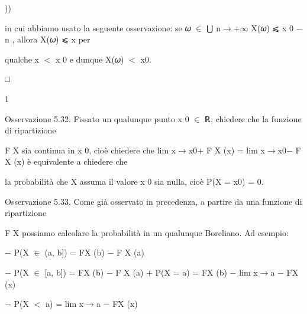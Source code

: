 \documentclass[a4paper,portrait,12pt]{article}
\begin{document}
))





\begin{flushleft}
in cui abbiamo usato la seguente osservazione: se 𝜔 $\in$ ⋃ n$\rightarrow$+$\infty$ X(𝜔) ⩽ x 0 $-$ n , allora X(𝜔) ⩽ x per
\end{flushleft}


\begin{flushleft}
qualche x $<$ x 0 e dunque X(𝜔) $<$ x0.
\end{flushleft}


□


1





\begin{flushleft}
Osservazione 5.32. Fissato un qualunque punto x 0 $\in$ ℝ, chiedere che la funzione di ripartizione
\end{flushleft}


\begin{flushleft}
F X sia continua in x 0, cio\`{e} chiedere che lim x$\rightarrow$x0+ F X (x) = lim x$\rightarrow$x0$-$ F X (x) \`{e} equivalente a chiedere che
\end{flushleft}


\begin{flushleft}
la probabilit\`{a} che X assuma il valore x 0 sia nulla, cio\`{e} P(X = x0) = 0.
\end{flushleft}


\begin{flushleft}
Osservazione 5.33. Come gi\`{a} osservato in precedenza, a partire da una funzione di ripartizione
\end{flushleft}


\begin{flushleft}
F X possiamo calcolare la probabilit\`{a} in un qualunque Boreliano. Ad esempio:
\end{flushleft}


\begin{flushleft}
$-$ P(X $\in$ (a, b]) = FX (b) $-$ F X (a)
\end{flushleft}


\begin{flushleft}
$-$ P(X $\in$ [a, b]) = FX (b) $-$ F X (a) + P(X = a) = FX (b) $-$ lim x$\rightarrow$a $-$ FX (x)
\end{flushleft}


\begin{flushleft}
$-$ P(X $<$ a) = lim x$\rightarrow$a $-$ FX (x)
\end{flushleft}
\end{document}
